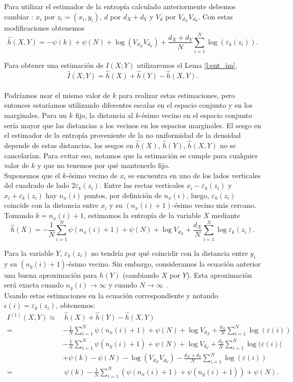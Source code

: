\documentclass[12pt,a4paper]{report} %
\theoremstyle{definition}
\begin{document}
Para utilizar el estimador de la entropía calculado anteriormente debemos cambiar\!\! : $x_i$ por $z_i=(x_i,y_i)$, $d$ por $d_X + d_Y$ y $V_d$ por $V_{d_X}V_{d_Y}$. Con estas modificaciones obtenemos\[
\widehat{h}(X,Y) = - \psi(k) + \psi(N) + \log (V_{d_X}V_{d_Y}) + \frac{d_X+d_Y}{N} \sum_{i=1}^N\log\left(\varepsilon_k(z_i)\right).
\]

Para obtener una estimación de $I(X;Y)$ utilizaremos el Lema \ref{l:ent_im},\[
\hat{I}(X;Y) = \hat{h}(X) + \hat{h}(Y) - \hat{h}(X,Y).
\]\\[-15pt]

Podríamos usar el mismo valor de $k$ para realizar estas estimaciones, pero entonces estaríamos utilizando diferentes escalas en el espacio conjunto y en los marginales. Para un $k$ fijo, la distancia al $k$-ésimo vecino en el espacio conjunto sería mayor que las distancias a los vecinos en los espacios marginales. El sesgo en el estimador de la entropía proveniente de la no uniformidad de la densidad depende de estas distancias, los sesgos en $\widehat{h}(X)$, $\widehat{h}(Y)$, $\widehat{h}(X,Y)$ no se cancelarían. Para evitar eso, notamos que la estimación se cumple para cualquier valor de $k$ y que no tenemos por qué mantenerlo fijo.\\

Suponemos que el $k$-ésimo vecino de $x_i$ se encuentra en uno de los lados verticales del cuadrado de lado $2\varepsilon_k(z_i)$. Entre las rectas verticales $x_i - \varepsilon_k(z_i)$ y $x_i + \varepsilon_k(z_i)$ hay $n_x(i)$ puntos, por definición de $n_x(i)$, luego, $\varepsilon_k(z_i)$ coincide con la distancia entre $x_i$ y su $(n_x(i) + 1)$-ésimo vecino más cercano. Tomando $k = n_x(i)+1$, estimamos la entropía de la variable $X$ mediante\[
\widehat{h}(X) = - \frac{1}{N}\sum_{i=1}^N\psi(n_x(i)+1) + \psi(N) + \log V_{d_X} + \frac{d_X}{N} \sum_{i=1}^N\log \varepsilon_k(z_i).
\]

Para la variable $Y$, $\varepsilon_k(z_i)$ no tendría por qué coincidir con la distancia entre $y_i$ y su $(n_y(i)+1)$-ésimo vecino. Sin embargo, consideramos la ecuación anterior una buena aproximación para $h(Y)$ (cambiando $X$ por $Y$). Esta aproximación será exacta cuando $n_y(i) \to \infty$ y cuando $N\to \infty$ \cite{singh_finite-sample_2016}.\\ 

Usando estas estimaciones en la ecuación correspondiente y notando $\epsilon(i) = \varepsilon_k(z_i)$, obtenemos:
\begin{align*}
  I^{(1)}(X,Y) \approx& \ \widehat{h}(X) + \widehat{h}(Y) - \widehat{h}(X, Y)\\ =& - \frac{1}{N}\sum_{i=1}^N\psi(n_x(i)+1) + \psi(N) + \log V_{d_X} + \frac{d_X}{N} \sum_{i=1}^N\log (\varepsilon(i))\\
  & - \frac{1}{N}\sum_{i=1}^N\psi(n_y(i)+1) + \psi(N) + \log V_{d_Y} + \frac{d_Y}{N} \sum_{i=1}^N\log (\varepsilon(i)(\\
  & + \psi(k) - \psi(N) - \log (V_{d_X}V_{d_Y}) - \frac{d_X+d_Y}{N} \sum_{i=1}^N\log(\varepsilon(i))\\
  =& \ \psi(k) - \frac{1}{N}\sum_{i=1}^N\left( \psi(n_x(i)+1) + \psi(n_y(i)+1) \right ) + \psi(N).\\[-5pt]
\end{align*}
\end{document}
